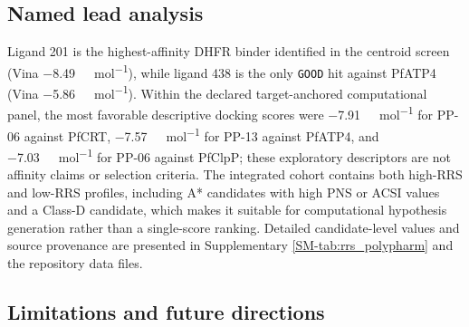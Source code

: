 \documentclass[journal=jcisd8,manuscript=article]{achemso}
\begin{document}
\subsection*{Named lead analysis}
\label{sec:discussion-leads}

Ligand 201 is the highest-affinity DHFR binder identified in the centroid screen (Vina \qty{-8.49}{\kilo\calorie\per\mole}), while ligand 438 is the only \texttt{GOOD} hit against PfATP4 (Vina \qty{-5.86}{\kilo\calorie\per\mole}). Within the declared target-anchored computational panel, the most favorable descriptive docking scores were \qty{-7.91}{\kilo\calorie\per\mole} for PP-06 against PfCRT, \qty{-7.57}{\kilo\calorie\per\mole} for PP-13 against PfATP4, and \qty{-7.03}{\kilo\calorie\per\mole} for PP-06 against PfClpP; these exploratory descriptors are not affinity claims or selection criteria. The integrated cohort contains both high-RRS and low-RRS profiles, including A* candidates with high PNS or ACSI values and a Class-D candidate, which makes it suitable for computational hypothesis generation rather than a single-score ranking. Detailed candidate-level values and source provenance are presented in Supplementary \cref{SM-tab:rrs_polypharm} and the repository data files.

\subsection*{Limitations and future directions}
\end{document}
